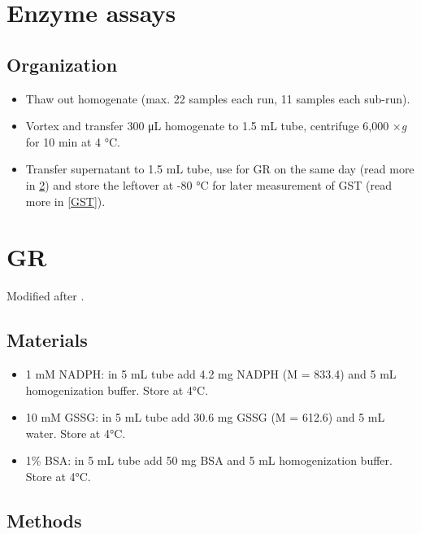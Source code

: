 \documentclass[
]{book}
\providecommand{\tightlist}{%
  \setlength{\itemsep}{0pt}\setlength{\parskip}{0pt}}
\begin{document}
\hypertarget{enzyme-assays}{%
\chapter{Enzyme assays}\label{enzyme-assays}}

\hypertarget{organization-1}{%
\section{Organization}\label{organization-1}}

\begin{itemize}
\tightlist
\item
  Thaw out homogenate (max. 22 samples each run, 11 samples each sub-run).
\item
  Vortex and transfer 300 μL homogenate to 1.5 mL tube, centrifuge 6,000 ×\emph{g} for 10 min at 4 °C.
\item
  Transfer supernatant to 1.5 mL tube, use for GR on the same day (read more in \ref{GR}) and store the leftover at -80 °C for later measurement of GST (read more in \ref{GST}).
\end{itemize}

\hypertarget{GR}{%
\chapter{GR}\label{GR}}

Modified after \textcite{mannervik1999}.

\hypertarget{materials-7}{%
\section{Materials}\label{materials-7}}

\begin{itemize}
\tightlist
\item
  1 mM NADPH: in 5 mL tube add 4.2 mg NADPH (M = 833.4) and 5 mL homogenization buffer. Store at 4°C.
\item
  10 mM GSSG: in 5 mL tube add 30.6 mg GSSG (M = 612.6) and 5 mL water. Store at 4°C.
\item
  1\% BSA: in 5 mL tube add 50 mg BSA and 5 mL homogenization buffer. Store at 4°C.
\end{itemize}

\hypertarget{methods-7}{%
\section{Methods}\label{methods-7}}
\end{document}
